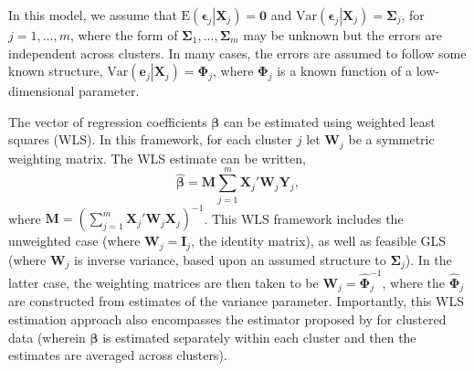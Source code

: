 \documentclass[12pt]{article}
\newcommand{\E}{\text{E}}
\newcommand{\Var}{\text{Var}}
\newcommand{\bm}{\mathbf}
\newcommand{\bs}{\boldsymbol}
\begin{document}
In this model, we assume that $\E\left(\bs\epsilon_j\left|\bm{X}_j\right.\right) = \bm{0}$ and $\Var\left(\bs\epsilon_j\left|\bm{X}_j\right.\right) = \bs\Sigma_j$, for $j = 1,...,m$, where the form of $\bs\Sigma_1,...,\bs\Sigma_m$ may be unknown but the errors are independent across clusters. In many cases, the errors are assumed to follow some known structure, $\Var\left(\bm{e}_j\left|\bm{X}_j\right.\right) = \bs\Phi_j$, where $\bs\Phi_j$ is a known function of a low-dimensional parameter. %


The vector of regression coefficients $\bm\beta$ can be estimated using weighted least squares (WLS). In this framework, for each cluster $j$ let $\bm{W}_j$ be a symmetric weighting matrix. The WLS estimate can be written,
\begin{equation}
\label{eq:WLS}
\bs{\hat\beta} = \bm{M} \sum_{j=1}^m \bm{X}_j' \bm{W}_j \bm{Y}_j, 
\end{equation}
where $\bm{M} = \left(\sum_{j=1}^m \bm{X}_j' \bm{W}_j \bm{X}_j\right)^{-1}$. %
This WLS framework includes the unweighted case (where $\bm{W}_j = \bm{I}_j$, the identity matrix), as well as feasible GLS (where $\bm{W}_j$ is inverse variance, based upon an assumed structure to $\bm\Sigma_j$). In the latter case, the weighting matrices are then taken to be $\bm{W}_j = \hat{\bs\Phi}_j^{-1}$, where the $\hat{\bs\Phi}_j$ are constructed from estimates of the variance parameter. Importantly, this WLS estimation approach also encompasses the estimator proposed by \citet{Ibragimov2010tstatistic} for clustered data (wherein $\bs\beta$ is estimated separately within each cluster and then the estimates are averaged across clusters). 

\end{document}
